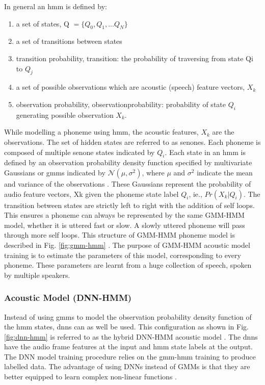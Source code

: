 In general an \gls{hmm} is defined by: 
\begin{enumerate}
    \item  a set of states, \gls{Q} $= \{Q_0, Q_1, ... Q_N\}$
    \item a set of transitions between states
    \item  transition probability, \gls{transition}: the
probability of traversing from state \gls{Qi} to $Q_j$
    \item a set of possible observations which are acoustic (speech) feature vectors, $X_k$
    \item  observation probability, \gls{observationprobability}: probability of state $Q_i$ generating  possible observation $X_k$.
\end{enumerate}
While modelling a phoneme using \gls{hmm}, the acoustic features, $X_k$ are the
observations. The set of hidden states are referred to as senones. Each phoneme is composed of multiple senone states indicated by $Q_i$. Each state
in an \gls{hmm} is defined by an observation probability density function specified by
multivariate Gaussians or \gls{gmm}s indicated by $\mathcal{N}(\mu,\sigma^2)$, where $\mu$ and $\sigma^2$ indicate the mean and variance of the observations \cite{gales2008application}. These Gaussians represent the probability of audio feature vectors, \gls{Xk} given the phoneme state label $Q_i$, ie., $Pr(X_k|Q_i)$. The
transition between states are strictly left to right with the addition of self
loops. This ensures a phoneme can always be represented by the same GMM-HMM
model, whether it is uttered fast or slow. A slowly uttered phoneme will pass
through more self loops. This structure of GMM-HMM phoneme model is
described in Fig. \ref{fig:gmm-hmm} \cite{meyer2019multi,benesty2008springer}. The purpose of GMM-HMM acoustic model training is to estimate the parameters of
this model, corresponding to every phoneme. These parameters are learnt from a
huge collection of speech, spoken by multiple speakers.

\subsubsection{Acoustic Model (DNN-HMM)}

Instead of using \gls{gmm}s to model the observation probability density function
of the \gls{hmm} states, \gls{dnn}s \cite{hinton2012deep} can as well be used. This
configuration as shown in Fig. \ref{fig:dnn-hmm} is referred to as the hybrid DNN-HMM acoustic model \cite{meyer2019multi,yu2015deep}. The \gls{dnn}s have the audio frame features at the input and \gls{hmm} state labels
at the output. The DNN model training procedure relies on the \gls{gmm}-\gls{hmm} training to produce labelled data.  The
advantage of using DNNs instead of GMMs is that they are better equipped to
learn complex non-linear functions \cite{madhavaraj2020strategies}. 


